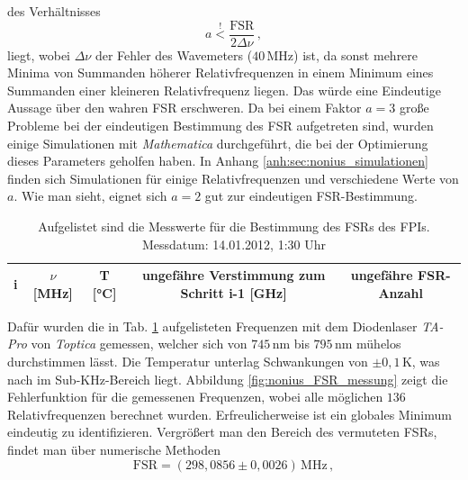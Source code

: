 des Verhältnisses
\begin{equation}\label{eq:nonius_faktor}
	a\stackrel{!}{<}\frac{\text{FSR}}{2\Delta\nu}\,,
\end{equation}
liegt, wobei $\Delta\nu$ der Fehler des Wavemeters ($40\,$MHz) ist, da sonst
mehrere Minima von Summanden höherer Relativfrequenzen in einem Minimum
eines Summanden einer kleineren Relativfrequenz liegen. Das würde eine
Eindeutige Aussage über den wahren FSR erschweren. Da bei
einem Faktor $a=3$ große Probleme bei der eindeutigen Bestimmung des FSR
aufgetreten sind, wurden einige Simulationen mit \textit{Mathematica}
durchgeführt, die bei der Optimierung dieses Parameters geholfen haben.
In Anhang \ref{anh:sec:nonius_simulationen} finden sich Simulationen für einige
Relativfrequenzen und verschiedene Werte von $a$. Wie man sieht, eignet sich
$a=2$ gut zur eindeutigen FSR-Bestimmung.\par
\begin{table}[h]
	\begin{tabular}{ccccc}
		\toprule
		\multicolumn{1}{C{0.05\textwidth}}{i} &
		\multicolumn{1}{C{0.15\textwidth}}{$\nu$ [MHz]} &
		\multicolumn{1}{C{0.10\textwidth}}{T [°C]} &
		\multicolumn{1}{C{0.25\textwidth}}{ungefähre Verstimmung zum
		Schritt i-1 [GHz]} &
		\multicolumn{1}{C{0.23\textwidth}}{ungefähre FSR-Anzahl}\\
		\midrule[1px]
		\hline
		
		\bottomrule[1px]
	\end{tabular}
	\caption[FSR Messung]{Aufgelistet sind die Messwerte für die Bestimmung des
	FSRs des FPIs. Messdatum: 14.01.2012, 1:30 Uhr}
	\label{tab:nonius_FSR_messung}
\end{table}
Dafür wurden die in Tab. \ref{tab:nonius_FSR_messung} aufgelisteten Frequenzen
mit dem Diodenlaser \textit{TA-Pro} von \textit{Toptica} gemessen, welcher sich
von $745\,$nm bis $795\,$nm mühelos durchstimmen lässt.
Die Temperatur unterlag Schwankungen von $\pm0,1\,$K, was nach
\cite{kuschnick:2000:diplomarbeit} im Sub-KHz-Bereich liegt.
Abbildung \ref{fig:nonius_FSR_messung} zeigt die Fehlerfunktion für die
gemessenen Frequenzen, wobei alle möglichen $136$ Relativfrequenzen berechnet
wurden. Erfreulicherweise ist ein globales Minimum eindeutig zu identifizieren.
Vergrößert man den Bereich des vermuteten FSRs, findet man über numerische
Methoden
\begin{equation}\label{eq:FSR_messung}
	\text{FSR}=(298,0856\pm0,0026)\,\text{MHz}\,,
\end{equation}
